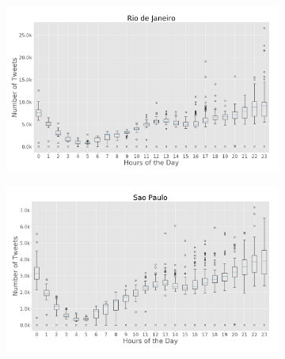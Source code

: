 \begin{figure}[htbp]
	\centering
	\begin{subfigure}[htbp]{0.45\textwidth}
		\centering
		\includegraphics[width=1\linewidth]{figures/rio_box_plt_hour_of_day.png}
		\caption{}
		\label{subfig:riodejaneiro_box_plot_hour_of_day}
	\end{subfigure}%
	\quad
	\begin{subfigure}[htbp]{0.45\textwidth}
		\centering
		\includegraphics[width=1\linewidth]{figures/sp_box_plt_hour_of_day.png}
		\caption{}
		\label{subfig:saopaulo_box_plot_hour_of_day}
	\end{subfigure}
	
	\medskip
	

\end{figure}
